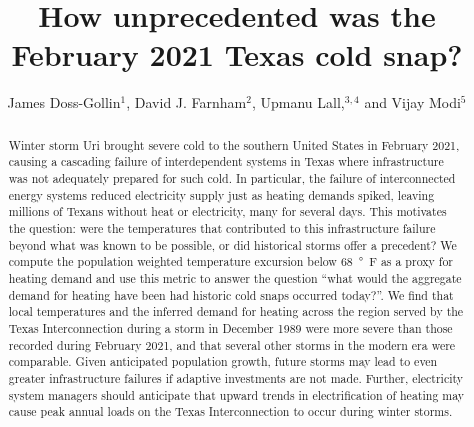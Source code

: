 \documentclass[12pt]{iopart}
\begin{document}
\title{How unprecedented was the February 2021 Texas cold snap?}

\author{James Doss-Gollin$^1$, David J. Farnham$^2$, Upmanu Lall,$^{3,4}$ and Vijay Modi$^5$}
\address{$^1$ Department of Civil and Environmental Engineering, Rice University, Houston, TX, USA (ORCID 0000-0002-3428-2224)}
\address{$^2$ Department of Global Ecology, Carnegie Institution for Science, Stanford, CA, USA (ORCID 0000-0002-6690-4251)}
\address{$^3$ Columbia Water Center, Columbia University, New York, NY, USA (ORCID 0000-0003-0529-8128)}
\address{$^4$ Department of Earth and Environmental Engineering, Columbia University, New York, NY, USA}
\address{$^4$ Department of Mechanical Engineering, Columbia University, New York, NY, USA (ORCID 0000-0003-2513-0437)}
\vspace{10pt}

\begin{abstract}
  Winter storm Uri brought severe cold to the southern United States in February 2021, causing a cascading failure of interdependent systems in Texas where infrastructure was not adequately prepared for such cold.
  In particular, the failure of interconnected energy systems reduced electricity supply just as heating demands spiked, leaving millions of Texans without heat or electricity, many for several days.
  This motivates the question: were the temperatures that contributed to this infrastructure failure beyond what was known to be possible, or did historical storms offer a precedent?
  We compute the population weighted temperature excursion below \SI{68}{\degree F} as a proxy for heating demand and use this metric to answer the question ``what would the aggregate demand for heating have been had historic cold snaps occurred today?''.
  We find that local temperatures and the inferred demand for heating across the region served by the Texas Interconnection during a storm in December 1989 were more severe than those recorded during February 2021, and that several other storms in the modern era were comparable.
  Given anticipated population growth, future storms may lead to even greater infrastructure failures if adaptive investments are not made.
  Further, electricity system managers should anticipate that upward trends in electrification of heating may cause peak annual loads on the Texas Interconnection to occur during winter storms.

\end{abstract}
\end{document}
